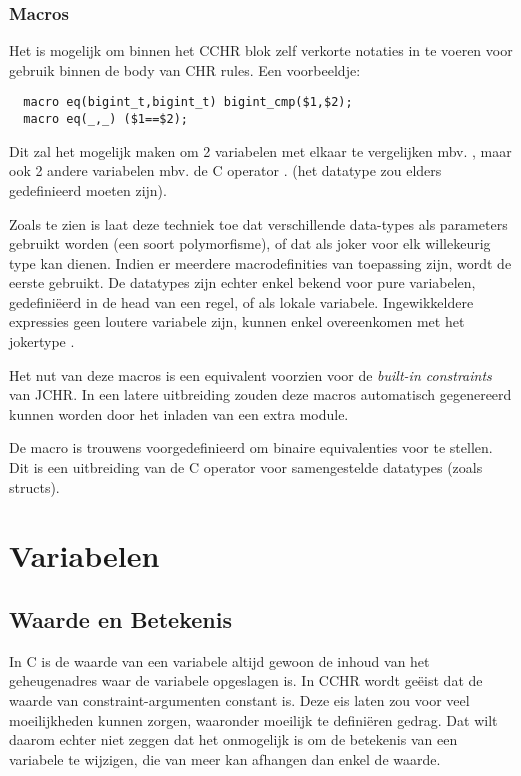 \subsubsection{Macros}

Het is mogelijk om binnen het CCHR blok zelf verkorte notaties in te voeren voor gebruik binnen de body van CHR rules. Een voorbeeldje: \begin{Verbatim}
  macro eq(bigint_t,bigint_t) bigint_cmp($1,$2);
  macro eq(_,_) ($1==$2);
\end{Verbatim}

Dit zal het mogelijk maken om 2  variabelen met elkaar te vergelijken mbv. , maar ook 2 andere variabelen mbv. de C operator \code{==}. (het datatype  zou elders gedefinieerd moeten zijn).

Zoals te zien is laat deze techniek toe dat verschillende data-types als parameters gebruikt worden (een soort polymorfisme), of dat \code{\_} als joker voor elk willekeurig type kan dienen. Indien er meerdere macrodefinities van toepassing zijn, wordt de eerste gebruikt. De datatypes zijn echter enkel bekend voor pure variabelen, gedefini\"eerd in de head van een regel, of als lokale variabele. Ingewikkeldere expressies geen loutere variabele zijn, kunnen enkel overeenkomen met het jokertype \code{\_}.

Het nut van deze macros is een equivalent voorzien voor de {\em built-in constraints} van JCHR. In een latere uitbreiding zouden deze macros automatisch gegenereerd kunnen worden door het inladen van een extra module.

De macro  is trouwens voorgedefinieerd om binaire equivalenties voor te stellen. Dit is een uitbreiding van de C operator \code{==} voor samengestelde datatypes (zoals structs).

\section{Variabelen} \label{sec:taal-var}

\subsection{Waarde en Betekenis}

In C is de waarde van een variabele altijd gewoon de inhoud van het geheugenadres waar de variabele opgeslagen is. In CCHR wordt ge\"eist dat de waarde van constraint-argumenten constant is. Deze eis laten zou voor veel moeilijkheden kunnen zorgen, waaronder moeilijk te defini\"eren gedrag. Dat wilt daarom echter niet zeggen dat het onmogelijk is om de betekenis van een variabele te wijzigen, die van meer kan afhangen dan enkel de waarde. 

